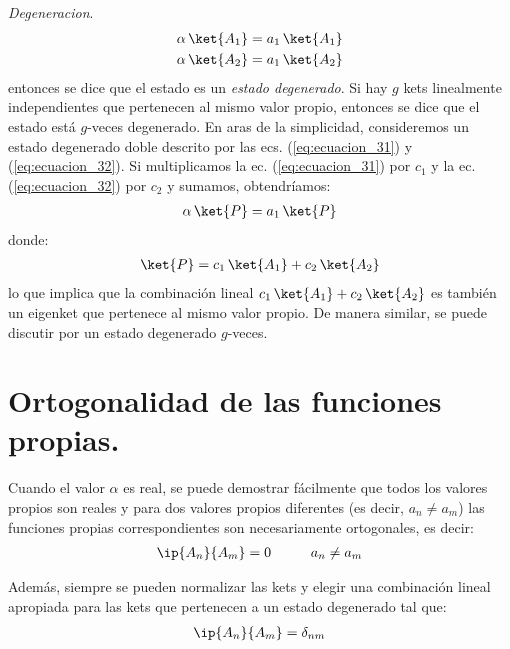\noindent
\emph{Degeneracion}.
\begin{align}
\alpha \, \ket{A_{1}} &= a_{1} \, \ket{A_{1}} \label{eq:ecuacion_31} \\
\alpha \, \ket{A_{2}} &= a_{1} \, \ket{A_{2}} \label{eq:ecuacion_32}
\end{align}
entonces se dice que el estado es un \emph{estado degenerado}. Si hay $g$ kets linealmente independientes que pertenecen al mismo valor propio, entonces se dice que el estado está $g$-veces degenerado. En aras de la simplicidad, consideremos un estado degenerado doble descrito por las ecs. (\ref{eq:ecuacion_31}) y (\ref{eq:ecuacion_32}). Si multiplicamos la ec. (\ref{eq:ecuacion_31}) por $c_{1}$ y la ec. (\ref{eq:ecuacion_32}) por $c_{2}$ y sumamos, obtendríamos:
\begin{align*}
\alpha \, \ket{P} = a_{1} \, \ket{P}
\end{align*}
donde:
\begin{align*}
\ket{P} = c_{1} \, \ket{A_{1}} + c_{2} \, \ket{A_{2}}
\end{align*}
lo que implica que la combinación lineal $c_{1} \, \ket{A_{1}} + c_{2} \, \ket{A_{2}}$ es también un eigenket que pertenece al mismo valor propio. De manera similar, se puede discutir por un estado degenerado $g$-veces.

\section{Ortogonalidad de las funciones propias.}

Cuando el valor $\alpha$ es real, se puede demostrar fácilmente que todos los valores propios son reales y para dos valores propios diferentes (es decir, $a_{n} \neq a_{m}$) las funciones propias correspondientes son necesariamente ortogonales, es decir:
\begin{align}
\ip{A_n}{A_{m}} = 0 \hspace{1cm} a_{n} \neq a_{m}
\label{eq:ecuacion_33}
\end{align}

Además, siempre se pueden normalizar las kets y elegir una combinación lineal apropiada para las kets que pertenecen a un estado degenerado tal que:
\begin{align}
\ip{A_{n}}{A_{m}} = \delta_{n m}
\label{eq:ecuacion_34}
\end{align}

